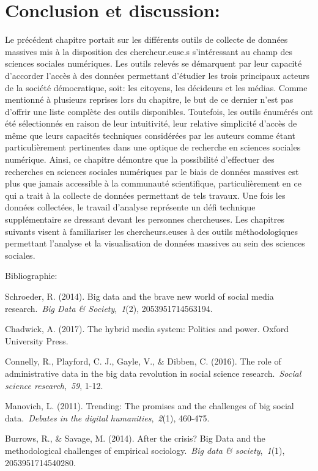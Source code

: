 \documentclass[
  letterpaper,
]{scrbook}
\begin{document}
\hypertarget{conclusion-et-discussion}{%
\section{Conclusion et discussion:}\label{conclusion-et-discussion}}

Le précédent chapitre portait sur les différents outils de collecte de
données massives mis à la disposition des chercheur.euse.s s'intéressant
au champ des sciences sociales numériques. Les outils relevés se
démarquent par leur capacité d'accorder l'accès à des données permettant
d'étudier les trois principaux acteurs de la société démocratique, soit:
les citoyens, les décideurs et les médias. Comme mentionné à plusieurs
reprises lors du chapitre, le but de ce dernier n'est pas d'offrir une
liste complète des outils disponibles. Toutefois, les outils énumérés
ont été sélectionnés en raison de leur intuitivité, leur relative
simplicité d'accès de même que leurs capacités techniques considérées
par les auteurs comme étant particulièrement pertinentes dans une
optique de recherche en sciences sociales numérique. Ainsi, ce chapitre
démontre que la possibilité d'effectuer des recherches en sciences
sociales numériques par le biais de données massives est plus que jamais
accessible à la communauté scientifique, particulièrement en ce qui a
trait à la collecte de données permettant de tels travaux. Une fois les
données collectées, le travail d'analyse représente un défi technique
supplémentaire se dressant devant les personnes chercheuses. Les
chapitres suivants visent à familiariser les chercheurs.euses à des
outils méthodologiques permettant l'analyse et la visualisation de
données massives au sein des sciences sociales.

Bibliographie:

Schroeder, R. (2014). Big data and the brave new world of social media
research.~\emph{Big Data \& Society},~\emph{1}(2), 2053951714563194.

Chadwick, A. (2017). The hybrid media system: Politics and power. Oxford
University Press.

Connelly, R., Playford, C. J., Gayle, V., \& Dibben, C. (2016). The role
of administrative data in the big data revolution in social science
research.~\emph{Social science research},~\emph{59}, 1-12.

Manovich, L. (2011). Trending: The promises and the challenges of big
social data.~\emph{Debates in the digital humanities},~\emph{2}(1),
460-475.

Burrows, R., \& Savage, M. (2014). After the crisis? Big Data and the
methodological challenges of empirical sociology.~\emph{Big data \&
society},~\emph{1}(1), 2053951714540280.
\end{document}

